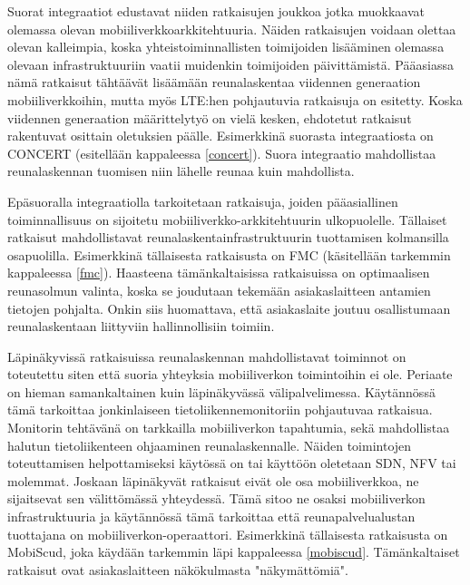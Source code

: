 Suorat integraatiot edustavat niiden ratkaisujen joukkoa jotka muokkaavat olemassa olevan mobiiliverkkoarkkitehtuuria.
Näiden ratkaisujen voidaan olettaa olevan kalleimpia, koska yhteistoiminnallisten toimijoiden lisääminen olemassa olevaan infrastruktuuriin vaatii muidenkin toimijoiden päivittämistä.
Pääasiassa nämä ratkaisut tähtäävät lisäämään reunalaskentaa viidennen generaation mobiiliverkkoihin, mutta myös LTE:hen pohjautuvia ratkaisuja on esitetty.
Koska viidennen generaation määrittelytyö on vielä kesken, ehdotetut ratkaisut rakentuvat osittain oletuksien päälle.
Esimerkkinä suorasta integraatiosta on CONCERT (esitellään kappaleessa \ref{concert}). Suora integraatio mahdollistaa reunalaskennan tuomisen niin lähelle reunaa kuin mahdollista.

Epäsuoralla integraatiolla tarkoitetaan ratkaisuja, joiden pääasiallinen toiminnallisuus on sijoitetu mobiiliverkko-arkkitehtuurin ulkopuolelle. 
Tällaiset ratkaisut mahdollistavat reunalaskentainfrastruktuurin tuottamisen kolmansilla osapuolilla. Esimerkkinä tällaisesta ratkaisusta on FMC (käsitellään tarkemmin kappaleessa \ref{fmc}). Haasteena tämänkaltaisissa ratkaisuissa on optimaalisen reunasolmun valinta, koska se joudutaan tekemään asiakaslaitteen antamien tietojen pohjalta. Onkin siis huomattava, että asiakaslaite joutuu osallistumaan reunalaskentaan liittyviin hallinnollisiin toimiin.

Läpinäkyvissä ratkaisuissa reunalaskennan mahdollistavat toiminnot on toteutettu siten että suoria yhteyksia mobiiliverkon toimintoihin ei ole. 
Periaate on hieman samankaltainen kuin läpinäkyvässä välipalvelimessa.
Käytännössä tämä tarkoittaa jonkinlaiseen tietoliikennemonitoriin pohjautuvaa ratkaisua. 
Monitorin tehtävänä on tarkkailla mobiiliverkon tapahtumia, sekä mahdollistaa halutun tietoliikenteen ohjaaminen reunalaskennalle.
Näiden toimintojen toteuttamisen helpottamiseksi käytössä on tai käyttöön oletetaan SDN, NFV tai molemmat.
Joskaan läpinäkyvät ratkaisut eivät ole osa mobiiliverkkoa, ne sijaitsevat sen välittömässä yhteydessä. Tämä sitoo ne osaksi mobiiliverkon infrastruktuuria ja käytännössä tämä tarkoittaa että reunapalvelualustan tuottajana on mobiiliverkon-operaattori. 
Esimerkkinä tällaisesta ratkaisusta on MobiScud, joka käydään tarkemmin läpi kappaleessa \ref{mobiscud}. Tämänkaltaiset ratkaisut ovat asiakaslaitteen näkökulmasta "näkymättömiä".
